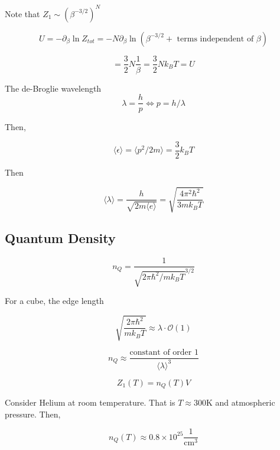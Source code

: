\documentclass{article}
\newtheorem{one minute paper}[theorem]{One Minute Paper}
\begin{document}
Note that $Z_1 \sim \left( \beta^{-3/2} \right)^{N}$

\begin{equation}
    U = -\partial_{\beta}\ln Z_{tot} = -N\partial_{\beta}\ln\left( \beta^{-3/2} + \text{ terms independent of $\beta$} \right) 
\end{equation}

\begin{equation}
    = \frac{3}{2}N\frac{1}{\beta} = \frac{3}{2}Nk_B T = U
\end{equation}

The de-Broglie wavelength $$\lambda = \frac{h}{p} \iff p = h/\lambda$$

Then, 

\begin{equation}
    \langle \epsilon \rangle = \langle p^2/2m \rangle = \frac{3}{2}k_B T 
\end{equation}

Then 

\begin{equation}
    \langle \lambda \rangle = \frac{h}{\sqrt{2m \langle e \rangle}} = \sqrt{\frac{4\pi^2 \hbar^2}{3m k_B T}}
\end{equation}

\subsection*{Quantum Density}

\begin{equation}
    n_Q = \frac{1}{\sqrt{2\pi \hbar^2/m k_B T}^{3/2}}
\end{equation}

For a cube, the edge length

\begin{equation}
    \sqrt{\frac{2\pi \hbar^2}{mk_B T}} \approx \lambda \cdot \mathcal{O}(1)
\end{equation}

\begin{equation}
    n_Q \approx \frac{\text{constant of order 1}}{\langle \lambda \rangle^3}
\end{equation}

\begin{equation}
    Z_1(T) = n_Q(T)V
\end{equation}

Consider Helium at room temperature. That is $T \approx 300$K and atmospheric pressure. Then, 

\begin{equation}
    n_Q(T) \approx 0.8 \times 10^{25}\frac{1}{\text{cm}^3}
\end{equation}
\end{document}
